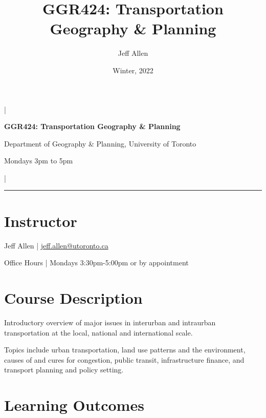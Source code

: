 \documentclass[11pt]{article}
\title{\textbf{GGR424: Transportation Geography \& Planning}}
\author{Jeff Allen}
\date{Winter, 2022}
\begin{document}
	\allsectionsfont{\sffamily}
	
	
	\begin{center}
		
		|
		
		\Large{\textsf{\textbf{GGR424: Transportation Geography \& Planning}}}
		
		\normalsize
				
		Department of Geography \& Planning, University of Toronto
		
		Mondays 3pm to 5pm
		
		|
		
		
		
		\vspace{5 mm}
		
		\hrule
		
	\end{center}
		

	
	
	
	\vspace{3 mm}
	
	
	\section*{\textsf{Instructor}}
	
	Jeff Allen | \url{jeff.allen@utoronto.ca}
	
	Office Hours | Mondays 3:30pm-5:00pm or by appointment
	
	
	
	
	
	
	
	\section*{Course Description}
	
	Introductory overview of major issues in interurban and intraurban transportation at the local, national and international scale. 
	
	Topics include urban transportation, land use patterns and the environment, causes of and cures for congestion, public transit, infrastructure finance, and transport planning and policy setting. 
	
	
	\section*{Learning Outcomes}
	
\end{document}
